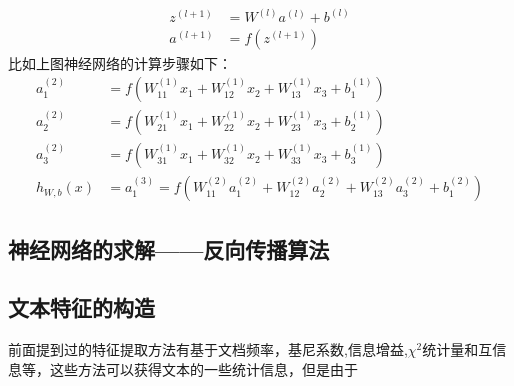 \documentclass[UTF8]{ctexart}
\begin{document}
	\begin{align*} 
		z^{(l+1)} &= W^{(l)} a^{(l)} + b^{(l)} \\ a^{(l+1)} &= f(z^{(l+1)}) 
	\end{align*} 
	比如上图神经网络的计算步骤如下：
	\begin{align*} 
	a_1^{(2)} &= f(W_{11}^{(1)}x_1 + W_{12}^{(1)} x_2 + W_{13}^{(1)} x_3 + b_1^{(1)}) \\ a_2^{(2)} &= f(W_{21}^{(1)}x_1 + W_{22}^{(1)} x_2 + W_{23}^{(1)} x_3 + b_2^{(1)}) \\ a_3^{(2)} &= f(W_{31}^{(1)}x_1 + W_{32}^{(1)} x_2 + W_{33}^{(1)} x_3 + b_3^{(1)}) \\ h_{W,b}(x) &= a_1^{(3)} = f(W_{11}^{(2)}a_1^{(2)} + W_{12}^{(2)} a_2^{(2)} + W_{13}^{(2)} a_3^{(2)} + b_1^{(2)}) 
	\end{align*} 
	
\subsection{神经网络的求解——反向传播算法}


\subsection{文本特征的构造}
	前面提到过的特征提取方法有基于文档频率，基尼系数,信息增益,$\chi^2$统计量和互信息等，这些方法可以获得文本的一些统计信息，但是由于
\end{document}
